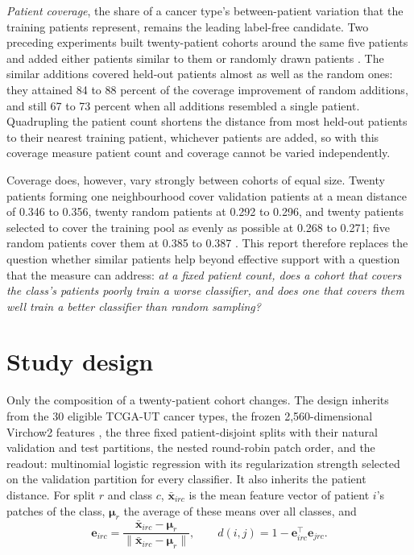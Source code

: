 \documentclass[11pt]{article}
\begin{document}
\emph{Patient coverage}, the share of a cancer type's between-patient variation that the training patients represent, remains the leading label-free candidate. Two preceding experiments built twenty-patient cohorts around the same five patients and added either patients similar to them or randomly drawn patients \citep{queisler2026patientCoverage,queisler2026concentratedCoverage}. The similar additions covered held-out patients almost as well as the random ones: they attained 84 to 88 percent of the coverage improvement of random additions, and still 67 to 73 percent when all additions resembled a single patient. Quadrupling the patient count shortens the distance from most held-out patients to their nearest training patient, whichever patients are added, so with this coverage measure patient count and coverage cannot be varied independently.

Coverage does, however, vary strongly between cohorts of equal size. Twenty patients forming one neighbourhood cover validation patients at a mean distance of 0.346 to 0.356, twenty random patients at 0.292 to 0.296, and twenty patients selected to cover the training pool as evenly as possible at 0.268 to 0.271; five random patients cover them at 0.385 to 0.387 \citep{queisler2026concentratedCoverage}. This report therefore replaces the question whether similar patients help beyond effective support with a question that the measure can address: \emph{at a fixed patient count, does a cohort that covers the class's patients poorly train a worse classifier, and does one that covers them well train a better classifier than random sampling?}

\section{Study design}
\label{sec:design}
Only the composition of a twenty-patient cohort changes. The design inherits from \citet{queisler2026concentratedCoverage} the 30 eligible TCGA-UT cancer types, the frozen 2,560-dimensional Virchow2 features \citep{zimmermann2024virchow2}, the three fixed patient-disjoint splits with their natural validation and test partitions, the nested round-robin patch order, and the readout: multinomial logistic regression with its regularization strength selected on the validation partition for every classifier. It also inherits the patient distance. For split $r$ and class $c$, $\bar{\mathbf x}_{irc}$ is the mean feature vector of patient $i$'s patches of the class, $\boldsymbol\mu_r$ the average of these means over all classes, and
\begin{equation}
 \mathbf e_{irc}=\frac{\bar{\mathbf x}_{irc}-\boldsymbol\mu_r}{\lVert\bar{\mathbf x}_{irc}-\boldsymbol\mu_r\rVert},
 \qquad
 d(i,j)=1-\mathbf e_{irc}^{\top}\mathbf e_{jrc}.
 \label{eq:distance}
\end{equation}
\end{document}

